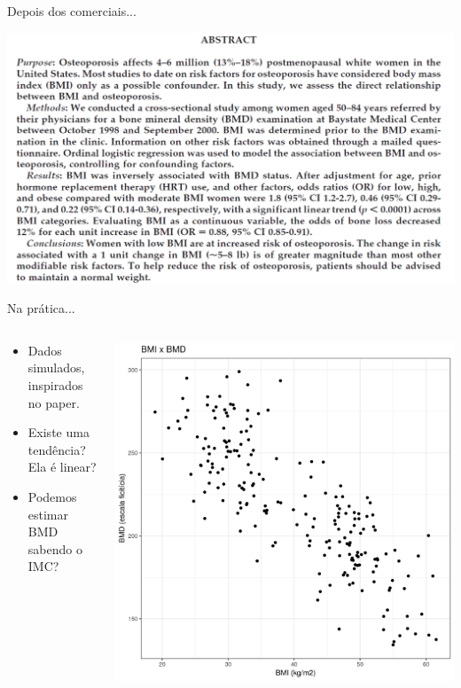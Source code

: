 \documentclass{beamer}
\begin{document}
\begin{frame}{Depois dos comerciais...}
  \begin{center}
    \includegraphics[width=1.175\textwidth]{Cap18-19/bmi-bmd-abstract}
  \end{center}
\end{frame}

\begin{frame}{Na prática...}
  \begin{columns}
    \begin{column}{5cm}
      \begin{itemize}
      \item Dados simulados, inspirados no paper.
      \item Existe uma tendência? Ela é linear?
      \item Podemos estimar BMD sabendo o IMC?
      \end{itemize}
    \end{column}
    \begin{column}{5cm}
      \begin{center}
        \includegraphics[width=\textwidth]{Cap18-19/pratica-rls1}
      \end{center}
    \end{column}
  \end{columns}
\end{frame}
\end{document}
